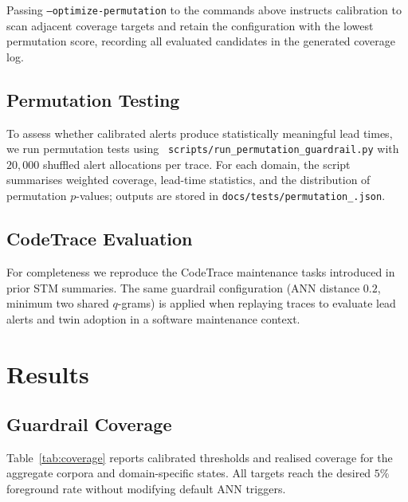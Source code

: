 \documentclass[11pt]{article}
\begin{document}
Passing \texttt{--optimize-permutation} to the commands above instructs
calibration to scan adjacent coverage targets and retain the configuration with
the lowest permutation score, recording all evaluated candidates in the
generated coverage log.

\subsection{Permutation Testing}
\label{subsec:permutation}
To assess whether calibrated alerts produce statistically meaningful lead times,
we run permutation tests using \
\texttt{scripts/run\_permutation\_guardrail.py} with $20{,}000$ shuffled alert
allocations per trace. For each domain, the script summarises weighted coverage,
lead-time statistics, and the distribution of permutation $p$-values; outputs are
stored in \texttt{docs/tests/permutation\_\*.json}.

\subsection{CodeTrace Evaluation}
For completeness we reproduce the CodeTrace maintenance tasks introduced in
prior STM summaries. The same guardrail configuration (ANN distance $0.2$,
minimum two shared $q$-grams) is applied when replaying traces to evaluate lead
alerts and twin adoption in a software maintenance context.

\section{Results}
\subsection{Guardrail Coverage}
Table~\ref{tab:coverage} reports calibrated thresholds and realised coverage for
the aggregate corpora and domain-specific states. All targets reach the desired
$5\%$ foreground rate without modifying default ANN triggers.
\end{document}
